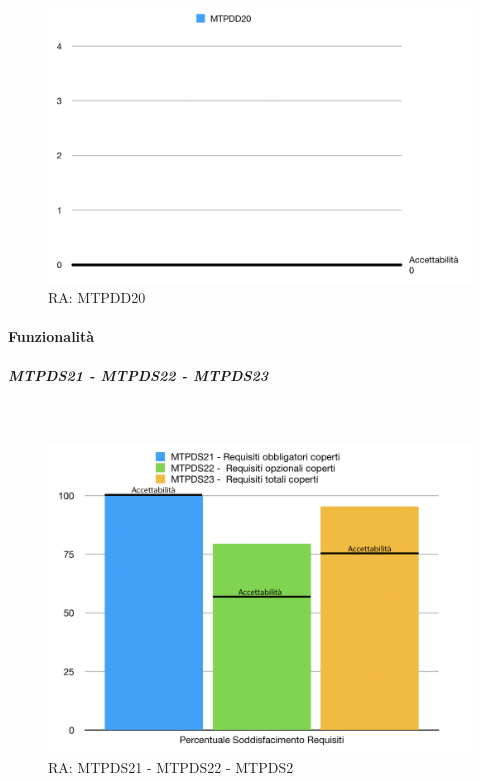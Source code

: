 \begin{figure}[H]
	\begin{center}
		\includegraphics[scale=0.5]{./images/grafici_RA/MTPDD20.png} 
		\caption{RA: MTPDD20}
	\end{center}
\end{figure}

\paragraph{Funzionalità}

\subparagraph{MTPDS21 - MTPDS22 - MTPDS23} \-\\

\begin{figure}[H]
	\begin{center}
		\includegraphics[scale=0.5]{./images/grafici_RA/Funzionalita.png} 
		\caption{RA: MTPDS21 - MTPDS22 - MTPDS2}
	\end{center}
\end{figure}

